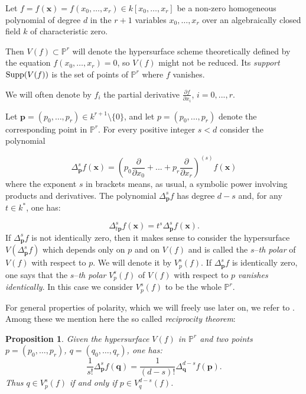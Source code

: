 \documentclass[11pt]{article}   %
\newtheorem{Proposition}[Theorem]{Proposition}
\theoremstyle{definition}
\numberwithin{Theorem}{section} \numberwithin{equation}{section}
\newcommand{\Proj}{{\mathbb P}}
\newcommand{\p}{{\mathbb P}}
\begin{document}
{Let $f=f(\mathbf{x})=f(x_0,\ldots,x_r)\in k[x_0,\ldots,x_r]$ be a non-zero
homogeneous polynomial of degree $d$ in the $r+1$ variables $x_0,\ldots,x_r$ over an
algebraically closed field $k$ of characteristic zero.

Then $V(f)\subset\p^r$ will denote the hypersurface  scheme theoretically defined by
the equation $f(x_0,\ldots,x_r)=0$, so $V(f)$ might not be reduced. Its {\it
support\/} ${\rm Supp}(V(f))$ is the set of points of $\Proj^ r$ where $f$ vanishes.

We will often denote by $f_i$ the partial derivative $\frac {\partial f} {\partial
x_i}$, $i=0,...,r$.


Let $\mathbf {p}=(p_0,\ldots,p_r)\in k^ {r+1}\setminus \{0\}$, and let
$p= (p_0,\ldots,p_r)$ denote the corresponding point in $\Proj^ r$. For
every positive integer $s< d$ consider the polynomial

$$\Delta^ s_\mathbf {p} f(\mathbf{x})=(p_0\frac {\partial}
{\partial x_0}+...+ p_r\frac {\partial} {\partial x_r})^ {(s)}f(\mathbf{x})$$ where
the exponent $s$ in brackets means, as usual, a symbolic power involving products
and derivatives. The polynomial $\Delta^ s_\mathbf {p}f$ has degree $d-s$ and, for
any $t\in k^ *$, one has:

$$\Delta_{t\mathbf{p}}^ sf(\mathbf{x})=t^s \Delta_\mathbf {p}^
sf(\mathbf{x}).$$
If $\Delta^ s_\mathbf {p} f$ is not identically
zero, then it makes sense to consider  the hypersurface $V(\Delta^
s_\mathbf {p} f)$ which depends only on $p$ and on $V(f)$ and is
called the $s$--{\it th polar} of $V(f)$ with respect to $p$. We
will denote it by $V_p^ s(f)$. If $\Delta^ s_\mathbf {p} f$ is
identically zero, one says that the $s$--{\it th polar} $V_p^ s(f)$
of $V(f)$ with respect to $p$ {\it vanishes identically}. In this
case we consider $V_p^ s(f)$ to be the whole $\Proj^ r$.

For general properties of polarity, which we will freely use later
on, we refer to \cite{Segrepr}. Among these we mention here the so
called {\it reciprocity theorem\/}:





\begin{Proposition}\label{recip} Given the hypersurface $V(f)$ in $\p^ r$
and two points $p= (p_0,\ldots,p_r)$, $q= (q_0,\ldots,q_r)$, one has:
$$\frac 1{s!} \Delta_\mathbf {p}^ s f(\mathbf{q})=\frac 1{(d-s)!}\Delta_\mathbf {q}^ {d-s}f(\mathbf{p}).$$
Thus $q\in V_p^ s(f)$ if and only if $p\in V_q^ {d-s}(f)$.
\end{Proposition}


}
\end{document}
